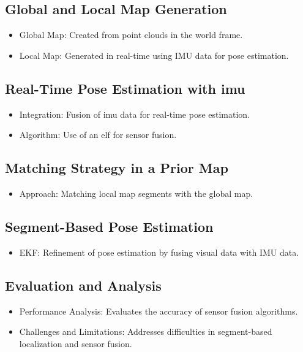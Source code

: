 \subsection{Global and Local Map Generation}
\begin{itemize}
    \item Global Map: Created from point clouds in the world frame.
    \item Local Map: Generated in real-time using IMU data for pose estimation.
\end{itemize}

\subsection{Real-Time Pose Estimation with \acrshort{imu}}
\begin{itemize}
    \item Integration: Fusion of \acrshort{imu} data for real-time pose estimation.
    \item Algorithm: Use of an \acrshort{elf} for sensor fusion.
\end{itemize}

\subsection{Matching Strategy in a Prior Map}
\begin{itemize}
    \item Approach: Matching local map segments with the global map.
\end{itemize}

\subsection{Segment-Based Pose Estimation}
\begin{itemize}
    \item EKF: Refinement of pose estimation by fusing visual data with IMU data.
\end{itemize}

\subsection{Evaluation and Analysis}
\begin{itemize}
    \item Performance Analysis: Evaluates the accuracy of sensor fusion algorithms.
    \item Challenges and Limitations: Addresses difficulties in segment-based localization and sensor fusion.
\end{itemize}


